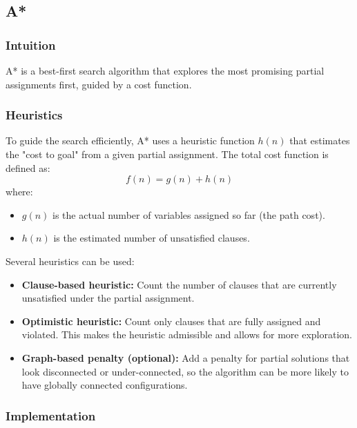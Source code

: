 \subsection{A*}

\subsubsection{Intuition}
A* is a best-first search algorithm that explores the most promising partial assignments first, guided by a cost function.

\subsubsection{Heuristics}
To guide the search efficiently, A* uses a heuristic function $h(n)$ that estimates the "cost to goal" from a given partial assignment. The total cost function is defined as:
\[
f(n) = g(n) + h(n)
\]
where:
\begin{itemize}
  \item $g(n)$ is the actual number of variables assigned so far (the path cost).
  \item $h(n)$ is the estimated number of unsatisfied clauses.
\end{itemize}

Several heuristics can be used:

\begin{itemize}
  \item \textbf{Clause-based heuristic:} Count the number of clauses that are currently unsatisfied under the partial assignment.

  \item \textbf{Optimistic heuristic:} Count only clauses that are fully assigned and violated. This makes the heuristic admissible and allows for more exploration.

  \item \textbf{Graph-based penalty (optional):} Add a penalty for partial solutions that look disconnected or under-connected, so the algorithm can be more likely to have globally connected configurations.
\end{itemize}

\subsubsection{Implementation}


